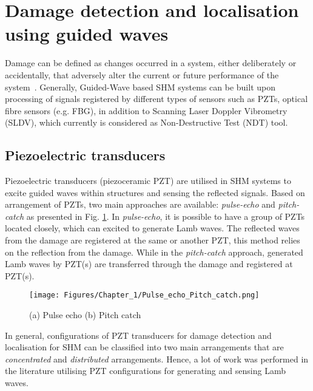 \section[Damage identification]{Damage detection and localisation using guided waves}
\label{sec23}
Damage can be defined as changes occurred in a system, either deliberately or accidentally, that adversely alter the current or future performance of the system~\cite{Farrar2012}. 
Generally, Guided-Wave based SHM systems can be built upon processing of signals registered by different types of sensors such as PZTs, optical fibre sensors (e.g. FBG), in addition to Scanning Laser Doppler Vibrometry (SLDV), which currently is considered as Non-Destructive Test (NDT) tool.
\subsection{Piezoelectric transducers} 
Piezoelectric transducers (piezoceramic PZT) are utilised in SHM systems to excite guided waves within structures and sensing the reflected signals. 
Based on arrangement of PZTs, two main approaches are available: \emph{pulse-echo} and \emph{pitch-catch} as presented in Fig. \ref{fig:Pulse_echo_Pitch_catch}.
In \emph{pulse-echo}, it is possible to have a group of PZTs located closely, which can excited to generate Lamb waves. 
The reflected waves from the damage are registered at the same or another PZT, this method relies on the reflection from the damage. 
While in the \emph{pitch-catch} approach, generated Lamb waves by PZT(s) are transferred through the damage and registered at PZT(s).
\begin{figure}[!ht]
	\begin{center}
		\centering
		\texttt{[image: Figures/Chapter\_1/Pulse\_echo\_Pitch\_catch.png]}
	\end{center}
	\caption{(a) Pulse echo	(b) Pitch catch} 
	\label{fig:Pulse_echo_Pitch_catch}
\end{figure}
In general, configurations of PZT transducers for damage detection and localisation for SHM can be classified into two main arrangements that are \emph{concentrated} and \emph{distributed} arrangements. 
Hence, a lot of work was performed in the literature utilising PZT configurations for generating and sensing  Lamb waves.

